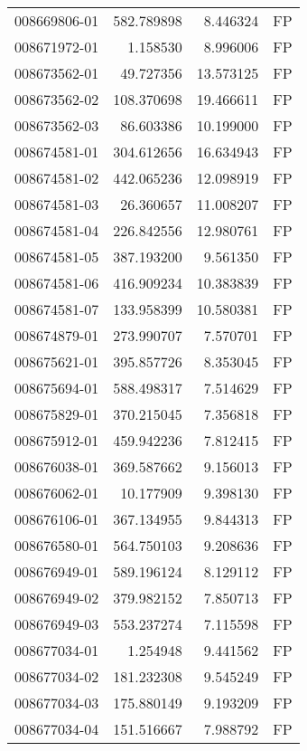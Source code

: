 \begin{tabular}{lrrl}
008669806-01 &  582.789898 &       8.446324 &   FP \\
008671972-01 &    1.158530 &       8.996006 &   FP \\
008673562-01 &   49.727356 &      13.573125 &   FP \\
008673562-02 &  108.370698 &      19.466611 &   FP \\
008673562-03 &   86.603386 &      10.199000 &   FP \\
008674581-01 &  304.612656 &      16.634943 &   FP \\
008674581-02 &  442.065236 &      12.098919 &   FP \\
008674581-03 &   26.360657 &      11.008207 &   FP \\
008674581-04 &  226.842556 &      12.980761 &   FP \\
008674581-05 &  387.193200 &       9.561350 &   FP \\
008674581-06 &  416.909234 &      10.383839 &   FP \\
008674581-07 &  133.958399 &      10.580381 &   FP \\
008674879-01 &  273.990707 &       7.570701 &   FP \\
008675621-01 &  395.857726 &       8.353045 &   FP \\
008675694-01 &  588.498317 &       7.514629 &   FP \\
008675829-01 &  370.215045 &       7.356818 &   FP \\
008675912-01 &  459.942236 &       7.812415 &   FP \\
008676038-01 &  369.587662 &       9.156013 &   FP \\
008676062-01 &   10.177909 &       9.398130 &   FP \\
008676106-01 &  367.134955 &       9.844313 &   FP \\
008676580-01 &  564.750103 &       9.208636 &   FP \\
008676949-01 &  589.196124 &       8.129112 &   FP \\
008676949-02 &  379.982152 &       7.850713 &   FP \\
008676949-03 &  553.237274 &       7.115598 &   FP \\
008677034-01 &    1.254948 &       9.441562 &   FP \\
008677034-02 &  181.232308 &       9.545249 &   FP \\
008677034-03 &  175.880149 &       9.193209 &   FP \\
008677034-04 &  151.516667 &       7.988792 &   FP \\

\end{tabular}
